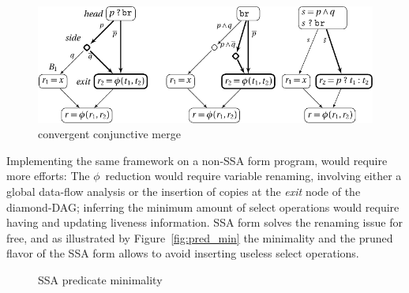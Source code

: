 \begin{figure}[h]
  \includegraphics[scale=0.9]{phi_merge}
  \caption{\label{fig:phi_merge}convergent conjunctive merge} 
\end{figure}

Implementing the same framework on a non-SSA form program, would require more efforts: The $\phi$~reduction would require variable renaming, involving either a global data-flow analysis or the insertion of copies at the \textit{exit} node of the diamond-DAG; inferring the minimum amount of {select} operations would require having and updating liveness information. SSA form solves the renaming issue for free, and as illustrated by Figure~\ref{fig:pred_min} the minimality and the pruned flavor of the SSA form allows to avoid inserting useless {select} operations.  

\begin{figure}[h]
\centering
  \hfill
\caption{\label{fig:pred_min} SSA predicate minimality}
\label{fig:minimality}
\end{figure}

